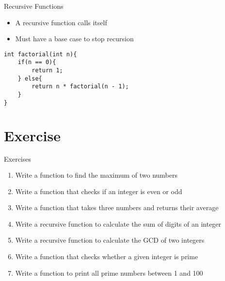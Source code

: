 \documentclass[12pt, aspectratio=169]{beamer}
\begin{document}


    \begin{frame}[fragile]{Recursive Functions}
        \begin{itemize}
            \item A recursive function calls itself
            \item Must have a base case to stop recursion
        \end{itemize}

        \begin{verbatim}
int factorial(int n){
    if(n == 0){
        return 1;
    } else{
        return n * factorial(n - 1);
    }
}
        \end{verbatim}
    \end{frame}


    \section{Exercise}

    \begin{frame}{Exercises}
        \begin{enumerate}
            \item Write a function to find the maximum of two numbers
            \item Write a function that checks if an integer is even or odd
            \item Write a function that takes three numbers and returns their average
            \item Write a recursive function to calculate the sum of digits of an integer
            \item Write a recursive function to calculate the GCD of two integers
            \item Write a function that checks whether a given integer is prime
            \item Write a function to print all prime numbers between 1 and 100
        \end{enumerate}
    \end{frame}
\end{document}
